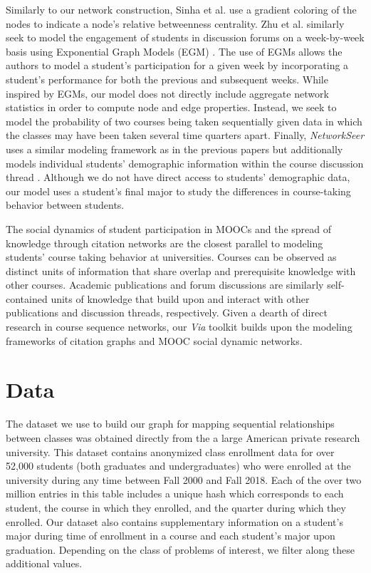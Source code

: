 \documentclass{sigchi}
\begin{document}
Similarly to our network construction, Sinha et al. use a gradient coloring of the nodes to indicate a node's relative betweenness centrality. Zhu et al. similarly seek to model the engagement of students in discussion forums on a week-by-week basis using Exponential Graph Models (EGM) \cite{Zhu2016}. The use of EGMs allows the authors to model a student's participation for a given week by incorporating a student's performance for both the previous and subsequent weeks. While inspired by EGMs, our model does not directly include aggregate network statistics in order to compute node and edge properties. Instead, we seek to model the probability of two courses being taken sequentially given data in which the classes may have been taken several time quarters apart. Finally, \textit{NetworkSeer} uses a similar modeling framework as in the previous papers but additionally models individual students' demographic information within the course discussion thread \cite{Wu2016}. Although we do not have direct access to students' demographic data, our model uses a student's final major to study the differences in course-taking behavior between students.


The social dynamics of student participation in MOOCs and the spread of knowledge through citation networks are the closest parallel to modeling students' course taking behavior at universities. Courses can be observed as distinct units of information that share overlap and prerequisite knowledge with other courses. Academic publications and forum discussions are similarly self-contained units of knowledge that build upon and interact with other publications and discussion threads, respectively. Given a dearth of direct research in course sequence networks, our \textit{Via} toolkit builds upon the modeling frameworks of citation graphs and MOOC social dynamic networks.

\section{Data}
\label{sec:data}
The dataset we use to build our graph for mapping sequential relationships between classes was obtained directly from the a large American private research university. This dataset contains anonymized class enrollment data for over 52,000 students (both graduates and undergraduates) who were enrolled at the university during any time between Fall 2000 and Fall 2018. Each of the over two million entries in this table includes a unique hash which corresponds to each student, the course in which they enrolled, and the quarter during which they enrolled. Our dataset also contains supplementary information on a student's major during time of enrollment in a course and each student's major upon graduation. Depending on the class of problems of interest, we filter along these additional values.
\end{document}
